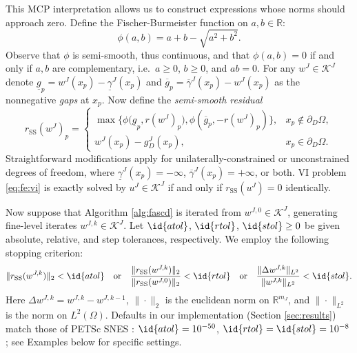 \documentclass[review,hidelinks,onefignum,onetabnum,final]{siamart220329}  %
\newcommand{\RR}{\mathbb{R}}
\newcommand{\cK}{\mathcal{K}}
\newcommand{\rSS}{r_{\text{SS}}}
\begin{document}
This MCP interpretation allows us to construct expressions whose norms should approach zero.  Define the Fischer-Burmeister function \cite{BensonMunson2006,Ulbrich2011} on $a,b\in\RR$:
\begin{equation}
\phi(a,b) = a + b - \sqrt{a^2 + b^2}. \label{eq:phiFB}
\end{equation}
Observe that $\phi$ is semi-smooth, thus continuous, and that $\phi(a,b)=0$ if and only if $a,b$ are complementary, i.e.~$a\ge 0$, $b\ge 0$, and $ab=0$.  For any $w^J\in \mathcal{K}^J$ denote $\underline{g}_p = w^J(x_p) - \underline{\gamma}^J(x_p)$ and $\overline{g}_p = \overline{\gamma}^J(x_p) - w^J(x_p)$ as the nonnegative \emph{gaps} at $x_p$.  Now define the \emph{semi-smooth residual}
\begin{equation}
\rSS(w^J)_p = \begin{cases}
\max\big\{\phi\big(\underline{g}_p, r(w^J)_p\big), \phi\left(\overline{g}_p, -r(w^J)_p\right)\big\}, & x_p \notin \partial_D\Omega, \\
w^J(x_p) - g_D^J(x_p), & x_p \in \partial_D\Omega.
\end{cases} \label{eq:rSS}
\end{equation}
Straightforward modifications apply for unilaterally-constrained or unconstrained degrees of freedom, where $\underline{\gamma}^J(x_p) = -\infty$, $\overline{\gamma}^J(x_p) = +\infty$, or both.  VI problem \eqref{eq:fe:vi} is exactly solved by $u^J\in\cK^J$ if and only if $\rSS(u^J)=0$ identically.

Now suppose that Algorithm \ref{alg:fascd} is iterated from $w^{J,0} \in \mathcal{K}^J$, generating fine-level iterates $w^{J,k} \in \mathcal{K}^J$.  Let $\id{atol}$, $\id{rtol}$, $\id{stol} \ge 0$ be given absolute, relative, and step tolerances, respectively.  We employ the following stopping criterion:
\begin{equation}
\|\rSS(w^{J,k})\|_2 < \id{atol} \quad \text{or} \quad \frac{\|\rSS(w^{J,k})\|_2}{\|\rSS(w^{J,0})\|_2} < \id{rtol} \quad \text{or} \quad \frac{\|\Delta w^{J,k}\|_{L^2}}{\|w^{J,k}\|_{L^2}} < \id{stol}. \label{eq:stoppingcriterion}
\end{equation}
Here $\Delta w^{J,k} = w^{J,k} -  w^{J,k-1}$, $\|\cdot\|_2$ is the euclidean norm on $\RR^{m_J}$, and $\|\cdot\|_{L^2}$ is the norm on $L^2(\Omega)$.  Defaults in our implementation (Section \ref{sec:results}) match those of PETSc SNES \cite{Balayetal2023}: $\id{atol}=10^{-50}$, $\id{rtol}=\id{stol}=10^{-8}$; see Examples below for specific settings.
\end{document}
